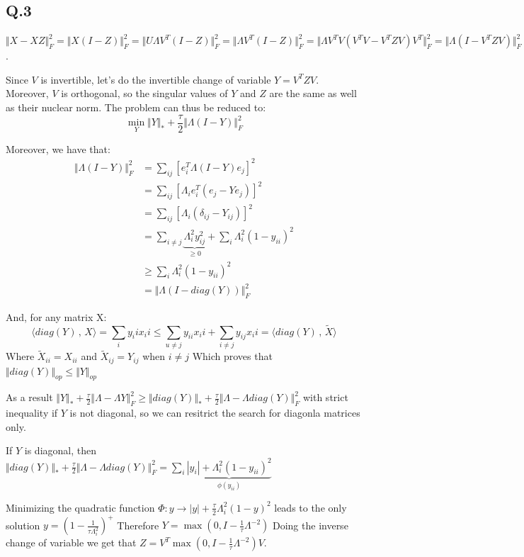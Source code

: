 \documentclass[12pt]{article}
\newcommand{\Q}[1]{\subsection*{Q.#1}}
\newenvironment{question}[1]
{\Q{#1}}{}
\newcommand{\fnorm}[1]{\Vert #1 \Vert_F}
\newcommand{\nucnorm}[1]{\Vert #1 \Vert_*}
\newcommand{\opnorm}[1]{\Vert #1 \Vert_{op}}
\newcommand{\inner}[2]{\langle #1 \, , \, #2 \rangle}
\begin{document}
\begin{question}{3}
\begin{enumerate}
    $\Vert X - XZ\Vert _F^2 = \Vert X (I - Z)\Vert _F^2 = \Vert U \Lambda V^T(I - Z)\Vert _F^2 = \Vert \Lambda V^T(I - Z)\Vert _F^2 = \Vert \Lambda V^T V(V^TV - V^TZV)V^T\Vert _F^2 = \Vert \Lambda (I - V^TZV)\Vert _F^2$.

    Since $V$ is invertible, let's do the invertible change of variable $Y = V^TZV$. Moreover, $V$ is orthogonal, so the singular values of $Y$ and $Z$ are the same as well as their nuclear norm. The problem can thus be reduced to:
    $$\min_Y \Vert Y\Vert _* + \frac{\tau}2 \Vert \Lambda(I -  Y)\Vert _F^2$$

    Moreover, we have that:
    \begin{align*}
      \fnorm{\Lambda (I - Y)}^2 &= \sum_{ij} [e_i^T \Lambda (I - Y)e_j]^2 \\
                                &= \sum_{ij} [\Lambda_i e_i^T(e_j - Ye_j)]^2 \\
                                &= \sum_{ij} [\Lambda_i (\delta_{ij} - Y_{ij})]^2 \\
                                &= \sum_{i \ne j} \underbrace{\Lambda_i^2 y_{ij}^2}_{\ge 0}  + \sum_i \Lambda_i^2 (1 - y_{ii})^2  \\
                                & \ge \sum_i \Lambda_i^2 (1 - y_{ii})^2  \\
                                &= \fnorm{\Lambda (I - diag(Y))}^2
    \end{align*}


    And, for any matrix X:
    $$\inner{diag(Y)}{ X} = \sum_i y_ii x_ii \le \sum_{u \ne j} y_{ii} x_ii + \sum_{i \ne j} y_{ij} x_ii = \inner{diag(Y)}{\tilde X}$$
    Where $\tilde X_{ii} = X_{ii}$ and $\tilde X_{ij} = Y_{ij}$ when $i \ne j$
    Which proves that $\opnorm{diag(Y)} \le \opnorm{Y}$
    
    As a result $\nucnorm{Y} + \frac{\tau}2 \fnorm{\Lambda - \Lambda Y}^2 \ge \nucnorm{diag(Y)} + \frac{\tau}2 \fnorm{\Lambda - \Lambda diag(Y)}^2$ with strict inequality if $Y$ is not diagonal, so we can resitrict the search for diagonla matrices only.

    If $Y$ is diagonal, then
    $\nucnorm{diag(Y)} + \frac{\tau}2 \fnorm{\Lambda - \Lambda diag(Y)}^2 = \sum_{i} \underbrace{|y_i| + \Lambda_i^2 (1 - y_{ii})^2}_{\phi(y_{ii})}$
    
    Minimizing the quadratic function $\Phi: y \rightarrow |y| + \frac{\tau}2 \Lambda_i^2 (1 - y)^2$ leads to the only solution $y = (1 - \frac1{\tau \Lambda_i^2})^+$
    Therefore $Y = \max(0, I - \frac1{\tau}\Lambda^{-2})$
    Doing the inverse change of variable we get that $Z = V^T\max(0, I - \frac1{\tau}\Lambda^{-2})V$.
  \end{enumerate}
  
\end{question}
\end{document}
